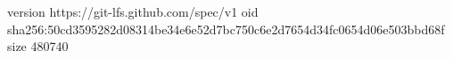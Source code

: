 version https://git-lfs.github.com/spec/v1
oid sha256:50cd3595282d08314be34e6e52d7bc750c6e2d7654d34fc0654d06e503bbd68f
size 480740
